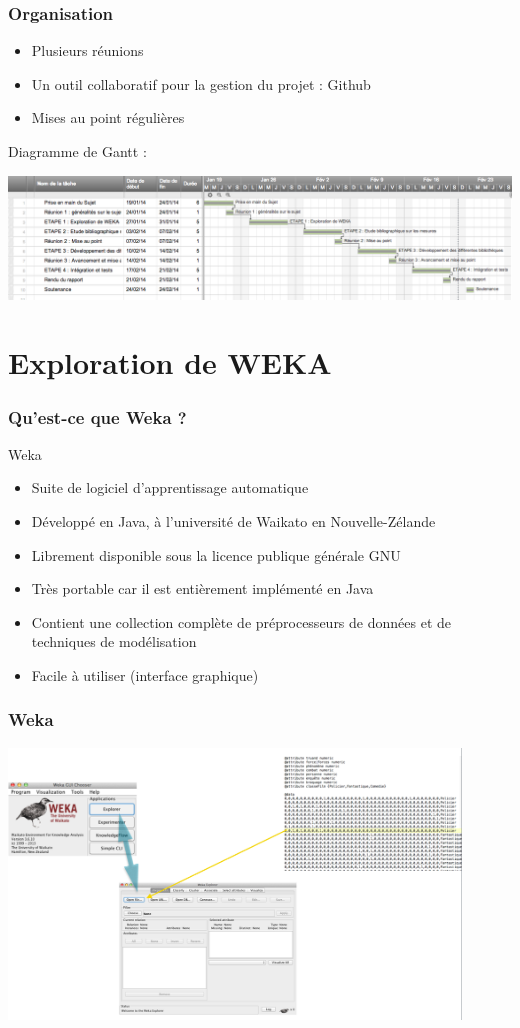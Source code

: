 \documentclass[12pt]{beamer}
\begin{document}
\begin{frame}
\frametitle{Organisation}
\begin{itemize}
	\item Plusieurs réunions
	\item Un outil collaboratif pour la gestion du projet : Github
	\item Mises au point régulières
\end{itemize}
Diagramme de Gantt :

\includegraphics[width=1.0\textwidth]{gantt}

\end{frame}



\section{Exploration de WEKA}

\begin{frame}
\frametitle{Qu'est-ce que Weka ?}
\begin{block}{Weka}
\begin{itemize}
\item Suite de logiciel d'apprentissage automatique
\item Développé en Java, à l'université de Waikato en Nouvelle-Zélande
\item Librement disponible sous la licence publique générale GNU
\item Très portable car il est entièrement implémenté en Java 
\item Contient une collection complète de préprocesseurs de données et de techniques de modélisation
\item Facile à utiliser (interface graphique)
\end{itemize}
\end{block}
\end{frame}

\begin{frame}
\frametitle{Weka}
\begin{center}
\includegraphics[width=0.90\textwidth]{weka-pres}
\end{center}
\end{frame}
\end{document}
